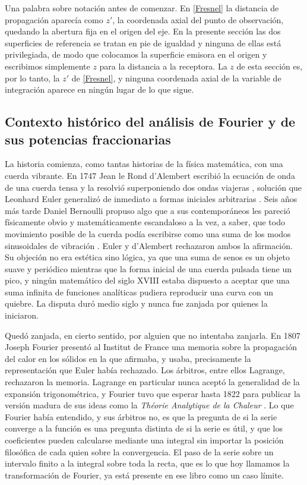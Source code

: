 	Una palabra sobre notación antes de comenzar. En \eqref{Fresnel} la distancia de propagación aparecía como $z'$, la coordenada axial del punto de observación, quedando la abertura fija en el origen del eje. En la presente sección las dos superficies de referencia se tratan en pie de igualdad y ninguna de ellas está privilegiada, de modo que colocamos la superficie emisora en el origen y escribimos simplemente $z$ para la distancia a la receptora. La $z$ de esta sección es, por lo tanto, la $z'$ de \eqref{Fresnel}, y ninguna coordenada axial de la variable de integración aparece en ningún lugar de lo que sigue.


	\subsection{Contexto histórico del análisis de Fourier y de sus potencias fraccionarias}

		La historia comienza, como tantas historias de la física matemática, con una cuerda vibrante. En 1747 Jean le Rond d'Alembert escribió la ecuación de onda de una cuerda tensa y la resolvió superponiendo dos ondas viajeras \citep{dalembert1747recherches}, solución que Leonhard Euler generalizó de inmediato a formas iniciales arbitrarias \citep{euler1748vibration}. Seis años más tarde Daniel Bernoulli propuso algo que a sus contemporáneos les pareció físicamente obvio y matemáticamente escandaloso a la vez, a saber, que todo movimiento posible de la cuerda podía escribirse como una suma de los modos sinusoidales de vibración \citep{bernoulli1753reflexions}. Euler y d'Alembert rechazaron ambos la afirmación. Su objeción no era estética sino lógica, ya que una suma de senos es un objeto suave y periódico mientras que la forma inicial de una cuerda pulsada tiene un pico, y ningún matemático del siglo XVIII estaba dispuesto a aceptar que una suma infinita de funciones analíticas pudiera reproducir una curva con un quiebre. La disputa duró medio siglo y nunca fue zanjada por quienes la iniciaron.

		Quedó zanjada, en cierto sentido, por alguien que no intentaba zanjarla. En 1807 Joseph Fourier presentó al Institut de France una memoria sobre la propagación del calor en los sólidos en la que afirmaba, y usaba, precisamente la representación que Euler había rechazado. Los árbitros, entre ellos Lagrange, rechazaron la memoria. Lagrange en particular nunca aceptó la generalidad de la expansión trigonométrica, y Fourier tuvo que esperar hasta 1822 para publicar la versión madura de sus ideas como la \textit{Théorie Analytique de la Chaleur} \citep{fourier1822theorie}. Lo que Fourier había entendido, y sus árbitros no, es que la pregunta de si la serie converge a la función es una pregunta distinta de si la serie es útil, y que los coeficientes pueden calcularse mediante una integral sin importar la posición filosófica de cada quien sobre la convergencia. El paso de la serie sobre un intervalo finito a la integral sobre toda la recta, que es lo que hoy llamamos la transformación de Fourier, ya está presente en ese libro como un caso límite.

